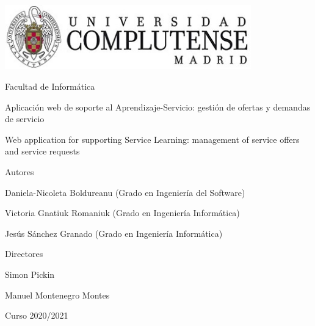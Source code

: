 \documentclass[11pt]{book}
\begin{document}
	\begin{titlepage}
		\centering
		{\includegraphics[width=0.8\textwidth]{logo}\par}
		\vspace{1cm}
		{\Large Facultad de Informática \par}
		\vspace{1cm}
		{\Huge Aplicación web de soporte al Aprendizaje-Servicio: gestión de ofertas y demandas de servicio\par}
		\vspace{1cm}
		{\Huge Web application for supporting Service Learning: management of service offers and service requests \par}
		\vspace{2cm}
		{\textbf\Large Autores \par}
		{\Large Daniela-Nicoleta Boldureanu (Grado en Ingeniería del Software)\par}
		{\Large Victoria Gnatiuk Romaniuk (Grado en Ingeniería Informática)\par}
		{\Large Jesús Sánchez Granado (Grado en Ingeniería Informática)\par}
		\vspace{1cm}
		{\textbf\Large Directores \par}
		{\Large Simon Pickin \par}
		{\Large Manuel Montenegro Montes \par}
		\vspace{2cm}
		{\Large Curso 2020/2021 \par}
	\end{titlepage}
	
	\tableofcontents
	\newpage
	\listoffigures
	
\end{document}
